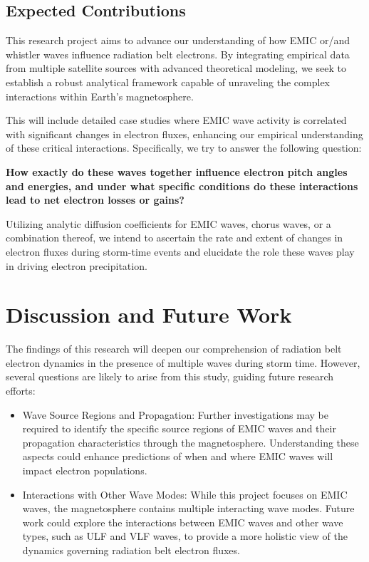 \documentclass[
  letterpaper,
  DIV=11,
  numbers=noendperiod]{scrartcl}
\begin{document}
\subsection{Expected Contributions}\label{expected-contributions}

This research project aims to advance our understanding of how EMIC or/and whistler waves influence radiation belt electrons. By integrating empirical data from multiple satellite sources with advanced theoretical modeling, we seek to establish a robust analytical framework capable of unraveling the complex interactions within Earth's magnetosphere.

This will include detailed case studies where EMIC wave activity is correlated with significant changes in electron fluxes, enhancing our empirical understanding of these critical interactions. Specifically, we try to answer the following question:

\textbf{How exactly do these waves together influence electron pitch angles and energies, and under what specific conditions do these interactions lead to net electron losses or gains?}

Utilizing analytic diffusion coefficients for EMIC waves, chorus waves, or a combination thereof, we intend to ascertain the rate and extent of changes in electron fluxes during storm-time events and elucidate the role these waves play in driving electron precipitation.

\section{Discussion and Future Work}\label{discussion-and-future-work}

The findings of this research will deepen our comprehension of radiation belt electron dynamics in the presence of multiple waves during storm time. However, several questions are likely to arise from this study, guiding future research efforts:

\begin{itemize}
\item
  Wave Source Regions and Propagation: Further investigations may be required to identify the specific source regions of EMIC waves and their propagation characteristics through the magnetosphere. Understanding these aspects could enhance predictions of when and where EMIC waves will impact electron populations.
\item
  Interactions with Other Wave Modes: While this project focuses on EMIC waves, the magnetosphere contains multiple interacting wave modes. Future work could explore the interactions between EMIC waves and other wave types, such as ULF and VLF waves, to provide a more holistic view of the dynamics governing radiation belt electron fluxes.
\end{itemize}
\end{document}
